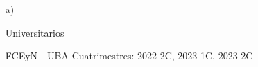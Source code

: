\begin{enumerate}[leftmargin=0.8cm]

  \item[a)]{Universitarios

    \begin{itemize}[leftmargin=0.2cm]

      {FCEyN - UBA}
      {Cuatrimestres: 2022-2C, 2023-1C, 2023-2C}{}

    \end{itemize}
  }

\end{enumerate}
